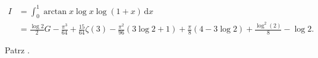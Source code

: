 %

\begin{problem_with_solution}
    \label{valean_1_23}%
    \begin{align}
        I & = \int_0^1 \arctan x \log x \log (1 + x) \,\mathrm{d}x \\
        & = \frac{\log 2}{2} G - \frac{\pi^3}{64} + \frac{15}{64} \zeta(3) - \frac{\pi^2}{96} (3 \log 2 + 1) + \frac{\pi} {8} (4-3 \log 2) + \frac{\log^2(2)}{8} - \log 2.
    \end{align} 
\end{problem_with_solution}


\begin{solution}
    Patrz \cite[s. 13, 14]{valean19}.
\end{solution}

%